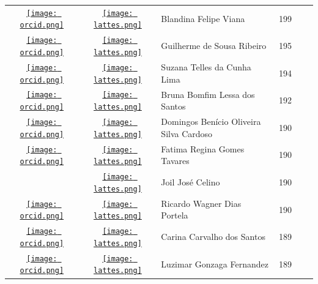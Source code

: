 \documentclass[12pt,brazil]{article}\usepackage[]{graphicx}\usepackage[]{xcolor}
\begin{document}
\begin{longtable}{cclrll}
\href{https://orcid.org/0000-0002-4924-1257}{\texttt{[image: orcid.png]}} & \href{http://lattes.cnpq.br/3442332785666908}{\texttt{[image: lattes.png]}} & Blandina Felipe Viana & 199 &  &  \\

\href{https://orcid.org/0000-0002-6798-2059}{\texttt{[image: orcid.png]}} & \href{http://lattes.cnpq.br/9005813884698823}{\texttt{[image: lattes.png]}} & Guilherme de Sousa Ribeiro & 195 &  &  \\

\href{http://orcid.org/0000-0002-9099-324X}{\texttt{[image: orcid.png]}} & \href{http://lattes.cnpq.br/1235128239764591}{\texttt{[image: lattes.png]}} & Suzana Telles da Cunha Lima & 194 &  &  \\

\href{https://orcid.org/0000-0003-4485-203X}{\texttt{[image: orcid.png]}} & \href{http://lattes.cnpq.br/4775068257764378}{\texttt{[image: lattes.png]}} & Bruna Bomfim Lessa dos Santos & 192 &  &  \\

\href{https://orcid.org/0000-0001-7072-2656}{\texttt{[image: orcid.png]}} & \href{http://lattes.cnpq.br/2228981567893077}{\texttt{[image: lattes.png]}} & Domingos Benício Oliveira Silva Cardoso & 190 &  &  \\

\href{https://orcid.org/0000-0001-6668-4300}{\texttt{[image: orcid.png]}} & \href{http://lattes.cnpq.br/6141190119426087}{\texttt{[image: lattes.png]}} & Fatima Regina Gomes Tavares & 190 &  &  \\

 & \href{http://lattes.cnpq.br/8472472348669864}{\texttt{[image: lattes.png]}} & Joil José Celino & 190 &  &  \\

\href{https://orcid.org/0000-0001-9095-776X}{\texttt{[image: orcid.png]}} & \href{http://lattes.cnpq.br/3118063347109613}{\texttt{[image: lattes.png]}} & Ricardo Wagner Dias Portela & 190 &  &  \\

\href{https://orcid.org/0000-0002-2898-0851}{\texttt{[image: orcid.png]}} & \href{http://lattes.cnpq.br/7313535995130086}{\texttt{[image: lattes.png]}} & Carina Carvalho dos Santos & 189 &  &  \\

\href{https://orcid.org/0000-0003-0837-6101}{\texttt{[image: orcid.png]}} & \href{http://lattes.cnpq.br/5869970809916591}{\texttt{[image: lattes.png]}} & Luzimar Gonzaga Fernandez & 189 &  &  \\


\end{longtable}
\end{document}
